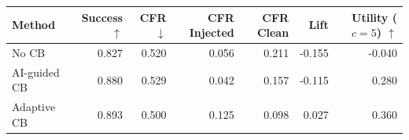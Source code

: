 \begin{tabular}{lrrrrrr}
\toprule
Method & Success $\uparrow$ & CFR $\downarrow$ & CFR Injected & CFR Clean & Lift & Utility ($c=5$) $\uparrow$ \\
\midrule
No CB & 0.827 & 0.520 & 0.056 & 0.211 & -0.155 & -0.040 \\
AI-guided CB & 0.880 & 0.529 & 0.042 & 0.157 & -0.115 & 0.280 \\
Adaptive CB & 0.893 & 0.500 & 0.125 & 0.098 & 0.027 & 0.360 \\
\bottomrule
\end{tabular}
